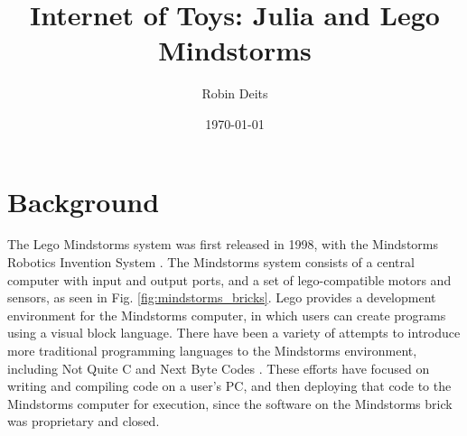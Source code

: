 \documentclass[]{article}
\author{Robin Deits}
\date{\today}
\title{Internet of Toys: Julia and Lego Mindstorms}
\begin{document}
\maketitle


\tableofcontents

\section{Background}
The Lego Mindstorms system was first released in 1998, with the Mindstorms Robotics Invention System \cite{the_lego_group_history_2015}. The Mindstorms system consists of a central computer with input and output ports, and a set of lego-compatible motors and sensors, as seen in Fig. \ref{fig:mindstorms_bricks}. Lego provides a development environment for the Mindstorms computer, in which users can create programs using a visual block language. There have been a variety of attempts to introduce more traditional programming languages to the Mindstorms environment, including Not Quite C \cite{_not_2007} and Next Byte Codes \cite{_next_2011}. These efforts have focused on writing and compiling code on a user's PC, and then deploying that code to the Mindstorms computer for execution, since the software on the Mindstorms brick was proprietary and closed. 
\end{document}

